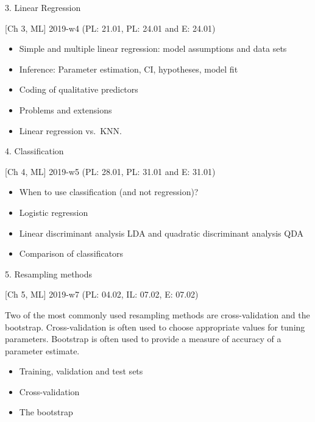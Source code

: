 \documentclass[ignorenonframetext,]{beamer}
\providecommand{\tightlist}{%
  \setlength{\itemsep}{0pt}\setlength{\parskip}{0pt}}
\begin{document}
\begin{frame}

\begin{block}{3. Linear Regression}

{[}Ch 3, ML{]} 2019-w4 (PL: 21.01, PL: 24.01 and E: 24.01)

\begin{itemize}
\tightlist
\item
  Simple and multiple linear regression: model assumptions and data sets
\item
  Inference: Parameter estimation, CI, hypotheses, model fit
\item
  Coding of qualitative predictors
\item
  Problems and extensions
\item
  Linear regression vs.~KNN.
\end{itemize}

\end{block}

\begin{block}{4. Classification}

{[}Ch 4, ML{]} 2019-w5 (PL: 28.01, PL: 31.01 and E: 31.01)

\begin{itemize}
\tightlist
\item
  When to use classification (and not regression)?
\item
  Logistic regression
\item
  Linear discriminant analysis LDA and quadratic discriminant analysis
  QDA
\item
  Comparison of classificators
\end{itemize}

\end{block}

\end{frame}

\begin{frame}

\begin{block}{5. Resampling methods}

{[}Ch 5, ML{]} 2019-w7 (PL: 04.02, IL: 07.02, E: 07.02)

Two of the most commonly used resampling methods are cross-validation
and the bootstrap. Cross-validation is often used to choose appropriate
values for tuning parameters. Bootstrap is often used to provide a
measure of accuracy of a parameter estimate.

\begin{itemize}
\tightlist
\item
  Training, validation and test sets
\item
  Cross-validation
\item
  The bootstrap
\end{itemize}

\end{block}

\end{frame}
\end{document}
